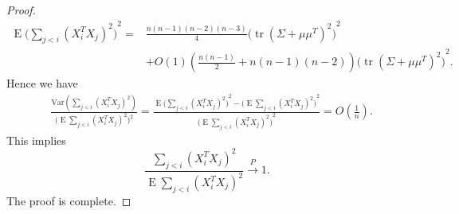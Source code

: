 \documentclass[review]{elsarticle}
\DeclareMathOperator{\mytr}{tr}
\DeclareMathOperator{\myE}{E}
\theoremstyle{plain}
\theoremstyle{definition}
\theoremstyle{remark}
\begin{document}
\begin{proof}
\begin{equation*}
\begin{aligned}
        \myE{\big(\sum_{j<i}{(X_i^T X_j)}^2\big)}^2
            =&\frac{n(n-1)(n-2)(n-3)}{4}{\big(\mytr (\Sigma+\mu\mu^T)^2\big)}^2\\
            &+O(1)(\frac{n(n-1)}{2}+n(n-1)(n-2)){\big(\mytr (\Sigma+\mu\mu^T)^2\big)}^2.
    \end{aligned}
    \end{equation*}
Hence we have
    \begin{equation*}
    \begin{aligned}
        &\frac{
        \mathrm{Var}(\sum_{j<i}{(X_i^T X_j)}^2)
    }{\big(\myE\sum_{j<i}{(X_i^T X_j)}^2\big)^2}
        =
    \frac{
        \myE{\big(\sum_{j<i}{(X_i^T X_j)}^2\big)}^2-
        {\big(\myE\sum_{j<i}{(X_i^T X_j)}^2\big)}^2
    }{
        {\big(\myE\sum_{j<i}{(X_i^T X_j)}^2\big)}^2
    }
    =O(\frac{1}{n}).
    \end{aligned}
    \end{equation*}
    This implies 
        \begin{equation*}
        \frac{
        \sum_{j<i}{(X_i^T X_j)}^2
    }{\myE\sum_{j<i}{(X_i^T X_j)}^2}\xrightarrow{P}1.
        \end{equation*}
    The proof is complete.
\end{proof}
\end{document}

